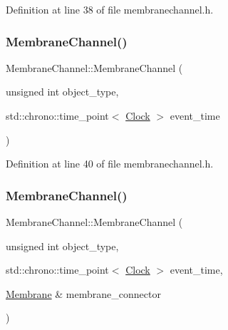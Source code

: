 Definition at line 38 of file membranechannel.\+h.

\mbox{\label{class_membrane_channel_aedc9eb52da9e7160850f552781df27b6}} 
\subsubsection{\texorpdfstring{Membrane\+Channel()}{MembraneChannel()}\hspace{0.1cm}{\footnotesize\ttfamily [3/4]}}
{\footnotesize\ttfamily Membrane\+Channel\+::\+Membrane\+Channel (\begin{DoxyParamCaption}\item[{unsigned int}]{object\+\_\+type,  }\item[{std\+::chrono\+::time\+\_\+point$<$ \hyperlink{universe_8h_a0ef8d951d1ca5ab3cfaf7ab4c7a6fd80}{Clock} $>$}]{event\+\_\+time }\end{DoxyParamCaption})\hspace{0.3cm}{\ttfamily [inline]}}



Definition at line 40 of file membranechannel.\+h.

\mbox{\label{class_membrane_channel_ac467743cbdebcdc6a77ad5ea0527e6f0}} 
\subsubsection{\texorpdfstring{Membrane\+Channel()}{MembraneChannel()}\hspace{0.1cm}{\footnotesize\ttfamily [4/4]}}
{\footnotesize\ttfamily Membrane\+Channel\+::\+Membrane\+Channel (\begin{DoxyParamCaption}\item[{unsigned int}]{object\+\_\+type,  }\item[{std\+::chrono\+::time\+\_\+point$<$ \hyperlink{universe_8h_a0ef8d951d1ca5ab3cfaf7ab4c7a6fd80}{Clock} $>$}]{event\+\_\+time,  }\item[{\hyperlink{class_membrane}{Membrane} \&}]{membrane\+\_\+connector }\end{DoxyParamCaption})\hspace{0.3cm}{\ttfamily [inline]}}




